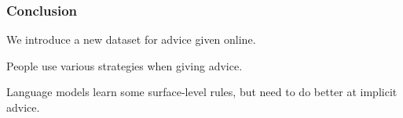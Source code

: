 \begin{frame}[c]\frametitle{Conclusion}

\begin{description}\itemsep10pt
    \item[Dataset] We introduce a new dataset for \alert{advice given online}.

    \pause

    \item[Advice Structure] People use various \alert{strategies} when giving advice.

    \pause

    \item[Modeling] Language models learn some surface-level rules, but need to do better at \alert{implicit advice}.
\end{description}

\end{frame}
